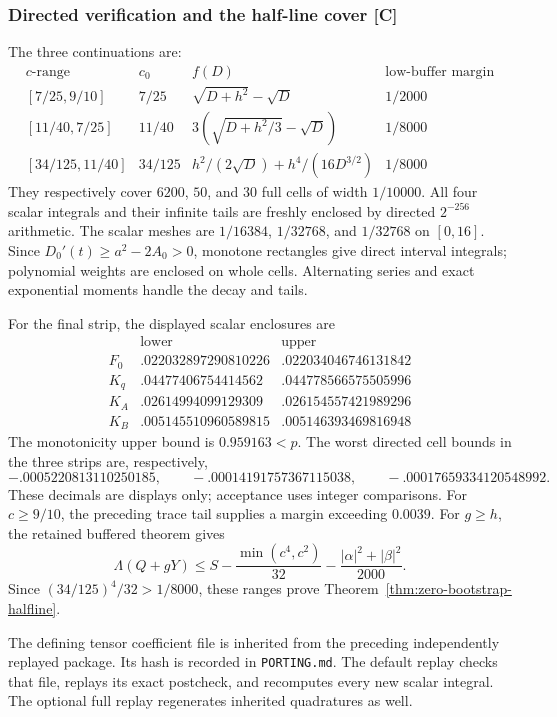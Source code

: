 \subsubsection{Directed verification and the half-line cover [C]}
The three continuations are:
\[
\begin{array}{c|c|c|c}
c\text{-range}&c_0& f(D)&\text{low-buffer margin}\\ \hline
{[7/25,9/10]}&7/25&
\sqrt{D+h^2}-\sqrt D&1/2000\\
{[11/40,7/25]}&11/40&
3(\sqrt{D+h^2/3}-\sqrt D)&1/8000\\
{[34/125,11/40]}&34/125&
h^2/(2\sqrt D)+h^4/(16D^{3/2})&1/8000
\end{array}
\]
They respectively cover \(6200\), \(50\), and \(30\) full cells of
width \(1/10000\).  All four scalar integrals and their infinite tails
are freshly enclosed by directed \(2^{-256}\) arithmetic.
The scalar meshes are \(1/16384\), \(1/32768\), and \(1/32768\)
on \([0,16]\).
Since \(D_0'(t)\ge a^2-2A_0>0\), monotone rectangles give direct
interval integrals; polynomial weights are enclosed on whole cells.
Alternating series and exact exponential moments handle the decay
and tails.

For the final strip, the displayed scalar enclosures are
\[
\begin{array}{c|cc}
 &\text{lower}&\text{upper}\\\hline
F_0&.022032897290810226&.022034046746131842\\
K_q&.04477406754414562&.044778566575505996\\
K_A&.02614994099129309&.026154557421989296\\
K_B&.005145510960589815&.005146393469816948
\end{array}
\]
The monotonicity upper bound is \(0.959163<p\).
The worst directed cell bounds in the three strips are, respectively,
\[
-.0005220813110250185,\qquad
-.00014191757367115038,\qquad
-.00017659334120548992.
\]
These decimals are displays only; acceptance uses integer comparisons.
For \(c\ge9/10\), the preceding trace tail supplies a margin exceeding
\(0.0039\).  For \(g\ge h\), the retained buffered theorem gives
\[
\Lambda(Q+gY)\le
S-\frac{\min(c^4,c^2)}{32}
-\frac{|\alpha|^2+|\beta|^2}{2000}.
\]
Since \((34/125)^4/32>1/8000\), these ranges prove
Theorem~\ref{thm:zero-bootstrap-halfline}.

The defining tensor coefficient file is inherited from the preceding
independently replayed package.  Its hash is recorded in
\texttt{PORTING.md}.  The default replay checks that file, replays
its exact postcheck, and recomputes every new scalar integral.
The optional full replay regenerates inherited quadratures as well.


